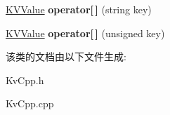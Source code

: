 \begin{DoxyCompactItemize}
\item 
\hypertarget{class_k_v_cpp_1_1_k_v_value_a59acfff176f5185905d7168186bc120b}{}\hyperlink{class_k_v_cpp_1_1_k_v_value}{K\+V\+Value} {\bfseries operator\mbox{[}$\,$\mbox{]}} (string key)\label{class_k_v_cpp_1_1_k_v_value_a59acfff176f5185905d7168186bc120b}

\item 
\hypertarget{class_k_v_cpp_1_1_k_v_value_a09d25da2ac42171f4cde5f5f84b38036}{}\hyperlink{class_k_v_cpp_1_1_k_v_value}{K\+V\+Value} {\bfseries operator\mbox{[}$\,$\mbox{]}} (unsigned key)\label{class_k_v_cpp_1_1_k_v_value_a09d25da2ac42171f4cde5f5f84b38036}

\end{DoxyCompactItemize}


该类的文档由以下文件生成\+:\begin{DoxyCompactItemize}
\item 
Kv\+Cpp.\+h\item 
Kv\+Cpp.\+cpp\end{DoxyCompactItemize}
